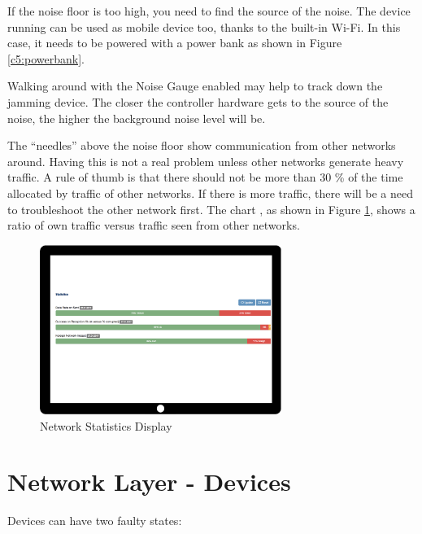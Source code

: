 If the noise floor is too high, you need to find the source of the noise. The device running \zway can be 
used as mobile device too, thanks to the built-in Wi-Fi. In this case, it needs to be 
powered with a power bank as shown in Figure \ref{c5:powerbank}.

Walking around with the Noise Gauge enabled may help to track down the jamming device. The 
closer the controller hardware gets to the source of the noise, the higher the background noise level will be.

The ``needles'' above the noise floor show communication from other \zwave networks around. 
Having this is not a real problem unless other networks generate heavy traffic. A rule of 
thumb is that there should not be more than 30 \% of the time allocated by traffic of 
other \zwave networks. If there is more traffic, there will be a need to troubleshoot 
the other \zwave network first. The chart , as shown 
in Figure \ref{c5:networkstat}, shows a ratio of own traffic versus traffic 
seen from other networks.

\begin{figure}
\begin{center}
\includegraphics[width=0.7\textwidth]{pngs/cap8/c5networkstatistics.pdf}
\caption{Network Statistics Display}
\label{c5:networkstat}
\end{center}
\end{figure}

\section{Network Layer - Devices}

Devices can have two faulty states:


